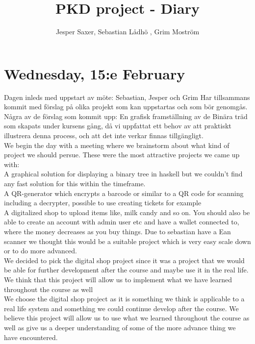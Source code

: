 \documentclass[11pt]{article}
\begin{document}
\title{PKD project - Diary}
\author{Jesper Saxer, Sebastian Lådhö , Grim Moström}
\date{}
\maketitle
\section*{Wednesday, 15:e February}
Dagen inleds med uppstart av möte: Sebastian, Jesper och Grim Har tillsammans kommit med förslag på olika projekt som kan uppstartas och som bör genomgås.
Några av de förslag som kommit upp:
En grafisk framställning av de Binära träd som skapats under kursens gång, då vi uppfattat ett behov av att praktiskt illustrera denna process, och att det inte verkar finnas tillgängligt.\\

We begin the day with a meeting where we brainstorm about what kind of project we should persue. These were the most attractive projects we came up with:\\
A graphical solution for displaying a binary tree in haskell but we couldn't find any fast solution for this within the timeframe.\\
A QR-generator which encrypts a barcode or similar to a QR code for scanning including a decrypter, possible to use creating tickets for example \\
A digitalized shop to upload items like, milk candy and so on. You should also be able to create an account with admin user etc and have a wallet connected to, where the money decreases as you buy things. Due to sebastian have a Ean scanner we thought this would be a suitable project which is very easy scale down or to do more advanced.\\

We decided to pick the digital shop project since it was a project that we would be able for further development after the course and maybe use it in the real life. We think that this project will allow us to implement what we have learned throughout the course as well \\

We choose the digital shop project as it is something we think is applicable to a real life system and something we could continue develop after the course. We believe this project will allow us to use what we learned throughout the course as well as give us a deeper understanding of some of the more advance thing we have encountered.\\
\end{document}

